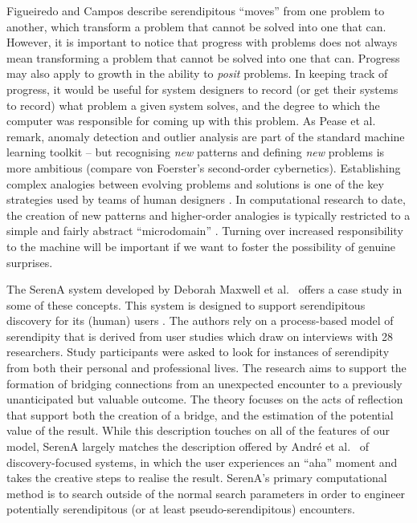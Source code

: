 Figueiredo and Campos \citeyear{Figueiredo2001} describe serendipitous ``moves'' from one
problem to another, which transform a problem that cannot be solved
into one that can.  
However, it is important to notice that progress with problems does not always mean transforming a
problem that cannot be solved into one that can.  Progress may also
apply to growth in the ability to \emph{posit} problems.  In keeping
track of progress, it would be useful for system designers to record
(or get their systems to record) what problem a given system solves,
and the degree to which the computer was responsible for coming up
with this problem.
%
As Pease et al. \citeyearpar[p. 69]{pease2013discussion} remark,
anomaly detection and outlier analysis are part of the standard
machine learning toolkit -- but recognising \emph{new} patterns and
defining \emph{new} problems is more ambitious (compare von Foerster's
\citeyearpar{von2003cybernetics} second-order cybernetics).
Establishing complex analogies between evolving problems and solutions
is one of the key strategies used by teams of human designers
\cite{Analogical-problem-evolution-DCC}.  In computational research to
date, the creation of new patterns and higher-order analogies is
typically restricted to a simple and fairly abstract ``microdomain''
\cite{hofstadter1994copycat,DBLP:journals/jetai/Marshall06}.
%
Turning over increased responsibility to the machine will be important
if we want to foster the possibility of genuine surprises.

The {\sf SerenA} system developed by Deborah Maxwell et
al.~\citeyear{maxwell2012designing} offers a case study in some
of these concepts.  This system is designed to support
serendipitous discovery for its (human) users
\cite{forth2013serena}.  The authors rely on a process-based
model of serendipity \cite{Makri2012,Makri2012a} that is derived
from user studies which draw on interviews with 28 researchers.
Study participants  were asked to look for instances of
serendipity from both
their personal and professional lives.  The research aims to
support the formation of bridging connections from an unexpected
encounter to a previously unanticipated but valuable outcome.
The theory focuses on the acts of reflection that support both
the creation of a bridge, and the estimation of the potential
value of the result.
%
While this description touches on all of the features of our model, {\sf
  SerenA} largely matches the description offered by Andr{\'e} et
al.~\citeyear{andre2009discovery} of discovery-focused systems, in which
the user experiences an ``aha'' moment and takes the
creative steps to realise the result.  {\sf SerenA}'s primary computational method is to
search outside of the normal search parameters in order to engineer
potentially serendipitous (or at least pseudo-serendipitous)
encounters.

